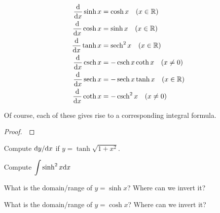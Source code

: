 \begin{theorem}
\begin{align}
\frac{\mathrm{d}}{\mathrm{d} x}\sinh x &= \cosh x\quad (x\in\mathbb R)\\
\frac{\mathrm{d}}{\mathrm{d} x}\cosh x &= \sinh x\quad (x\in\mathbb R)\\
\frac{\mathrm{d}}{\mathrm{d} x}\tanh x &= \operatorname{sech}^2 x\quad (x\in\mathbb R)\\
\frac{\mathrm{d}}{\mathrm{d} x}\operatorname{csch} x &= -\operatorname{csch} x\coth x\quad (x\ne 0)\\
\frac{\mathrm{d}}{\mathrm{d} x}\operatorname{sech} x &= -\operatorname{sech} x\tanh x\quad (x\in \mathbb R)\\
\frac{\mathrm{d}}{\mathrm{d} x}\coth x &= -\operatorname{csch}^2 x\quad (x\ne 0)
\end{align}
\end{theorem}
\begin{remark}
Of course, each of these gives rise to a corresponding integral formula.
\end{remark}
\begin{proof}\,

\vspace{5in}
\end{proof}

\newpage

\begin{example}
Compute $\mathrm{d} y/\mathrm{d} x$ if $y=\tanh \sqrt{1+x^2}$.
\end{example}
\vfill

\begin{example}
Compute $\displaystyle\int\sinh^2 x\mathrm{d} x$
\end{example}
\vfill

\newpage

\begin{example}
What is the domain/range of $y=\sinh x$?
Where can we invert it?
\end{example}
\vfill

\begin{example}
What is the domain/range of $y=\cosh x$?
Where can we invert it?
\end{example}
\vfill

\newpage

